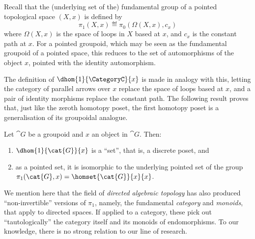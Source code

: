 \begin{remark}\label{rem: pi1 of a groupoid}
    Recall that the (underlying set of the) fundamental group of a pointed topological space $(X, x)$ is defined by
    \begin{equation*}
        \pi_1(X, x) \eqdef \pi_0(\Omega(X, x), c_x)
    \end{equation*}
    where $\Omega(X, x)$ is the space of loops in $X$ based at $x$, and $c_x$ is the constant path at $x$.
    For a pointed groupoid, which may be seen as the fundamental groupoid of a pointed space, this reduces to the set of automorphisms of the object $x$, pointed with the identity automorphism.
    
    The definition of $\dhom{1}{\CategoryC}{x}$ is made in analogy with this, letting the category of parallel arrows over $x$ replace the space of loops based at $x$, and a pair of identity morphisms replace the constant path.
    The following result proves that, just like the zeroth homotopy poset, the first homotopy poset is a generalisation of its groupoidal analogue.
\end{remark}
%
%
\begin{proposition}\label{prop: dhom1 is pi1 for groupoids}
    Let $\cat{G}$ be a groupoid and $x$ an object in $\cat{G}$.
    Then:
    \begin{enumerate}
        \item $\dhom{1}{\cat{G}}{x}$ is a ``set'', that is, a discrete poset, and
        \item as a pointed set, it is isomorphic to the underlying pointed set of the group $\pi_1(\cat{G}, x) = \homset{\cat{G}}{x}{x}$.
    \end{enumerate}
\end{proposition}

\begin{remark}
    We mention here that the field of \emph{directed algebraic topology} \cite{grandis2009directed, fajstrup2016directed} has also produced ``non-invertible'' versions of $\pi_1$, namely, the fundamental \emph{category} and \emph{monoids}, that apply to directed spaces.
    If applied to a category, these pick out ``tautologically'' the category itself and its monoids of endomorphisms.
    To our knowledge, there is no strong relation to our line of research.
\end{remark}

